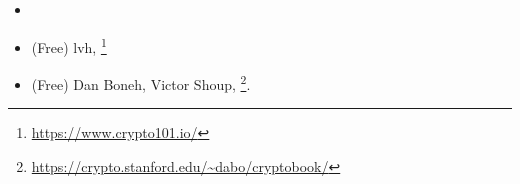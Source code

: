 \subsection{}
\label{crypto_books}

\begin{itemize}
\item \Schneier{}

\item (Free) lvh, \footnote{\AlsoAvailableAs \url{https://www.crypto101.io/}}

\item (Free) Dan Boneh, Victor Shoup, \footnote{\AlsoAvailableAs \url{https://crypto.stanford.edu/~dabo/cryptobook/}}.
\end{itemize}

